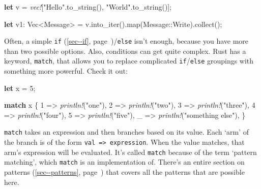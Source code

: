 \documentclass[a4paper,]{book}
\renewcommand*{\hyperref}[2][\ar]{%
  \def\ar{#2}%
  #2 (\autoref{#1}, page~\pageref{#1})}
\newenvironment{Shaded}{\begin{snugshade}}{\end{snugshade}}
\newcommand{\KeywordTok}[1]{\textcolor[rgb]{0.13,0.29,0.53}{\textbf{{#1}}}}
\newcommand{\DataTypeTok}[1]{\textcolor[rgb]{0.13,0.29,0.53}{{#1}}}
\newcommand{\DecValTok}[1]{\textcolor[rgb]{0.00,0.00,0.81}{{#1}}}
\newcommand{\StringTok}[1]{\textcolor[rgb]{0.31,0.60,0.02}{{#1}}}
\newcommand{\PreprocessorTok}[1]{\textcolor[rgb]{0.56,0.35,0.01}{\textit{{#1}}}}
\newcommand{\NormalTok}[1]{{#1}}
\begin{document}
\begin{Shaded}
\begin{Highlighting}[]

\KeywordTok{let} \NormalTok{v = }\PreprocessorTok{vec!}\NormalTok{[}\StringTok{"Hello"}\NormalTok{.to_string(), }\StringTok{"World"}\NormalTok{.to_string()];}

\KeywordTok{let} \NormalTok{v1: }\DataTypeTok{Vec}\NormalTok{<Message> = v.into_iter().map(Message::Write).collect();}
\end{Highlighting}
\end{Shaded}


Often, a simple \hyperref[sec--if]{\texttt{if}}/\texttt{else} isn't
enough, because you have more than two possible options. Also,
conditions can get quite complex. Rust has a keyword, \texttt{match},
that allows you to replace complicated \texttt{if}/\texttt{else}
groupings with something more powerful. Check it out:

\begin{Shaded}
\begin{Highlighting}[]
\KeywordTok{let} \NormalTok{x = }\DecValTok{5}\NormalTok{;}

\KeywordTok{match} \NormalTok{x \{}
    \DecValTok{1} \NormalTok{=> }\PreprocessorTok{println!}\NormalTok{(}\StringTok{"one"}\NormalTok{),}
    \DecValTok{2} \NormalTok{=> }\PreprocessorTok{println!}\NormalTok{(}\StringTok{"two"}\NormalTok{),}
    \DecValTok{3} \NormalTok{=> }\PreprocessorTok{println!}\NormalTok{(}\StringTok{"three"}\NormalTok{),}
    \DecValTok{4} \NormalTok{=> }\PreprocessorTok{println!}\NormalTok{(}\StringTok{"four"}\NormalTok{),}
    \DecValTok{5} \NormalTok{=> }\PreprocessorTok{println!}\NormalTok{(}\StringTok{"five"}\NormalTok{),}
    \NormalTok{_ => }\PreprocessorTok{println!}\NormalTok{(}\StringTok{"something else"}\NormalTok{),}
\NormalTok{\}}
\end{Highlighting}
\end{Shaded}

\texttt{match} takes an expression and then branches based on its value.
Each `arm' of the branch is of the form
\texttt{val\ =\textgreater{}\ expression}. When the value matches, that
arm's expression will be evaluated. It's called \texttt{match} because
of the term `pattern matching', which \texttt{match} is an
implementation of. There's an \hyperref[sec--patterns]{entire section on
patterns} that covers all the patterns that are possible here.
\end{document}
